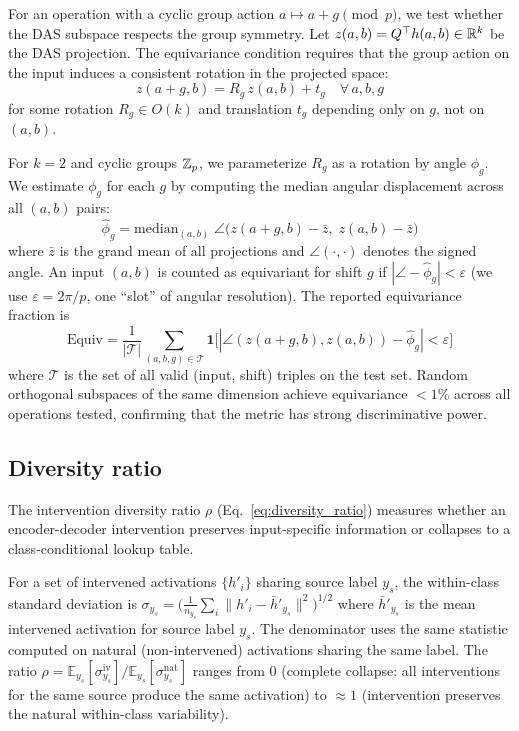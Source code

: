For an operation with a cyclic group action $a \mapsto a + g \pmod{p}$,
we test whether the DAS subspace respects the group symmetry. Let
$z(a,b) = Q^\top h(a,b) \in \mathbb{R}^k$ be the DAS projection. The equivariance
condition requires that the group action on the input induces a
consistent rotation in the projected space:
\begin{equation}
z(a + g, b) = R_g \, z(a, b) + t_g \quad \forall\, a, b, g
\label{eq:equiv_condition}
\end{equation}
for some rotation $R_g \in O(k)$ and translation $t_g$ depending only on
$g$, not on $(a,b)$.

For $k = 2$ and cyclic groups $\mathbb{Z}_p$, we parameterize $R_g$ as a rotation by
angle $\phi_g$. We estimate $\phi_g$ for each $g$ by computing the
median angular displacement across all $(a,b)$ pairs:
\begin{equation}
\hat\phi_g = \mathrm{median}_{(a,b)} \;\angle\bigl(z(a{+}g, b) - \bar{z},\;
z(a, b) - \bar{z}\bigr)
\label{eq:angle_estimate}
\end{equation}
where $\bar{z}$ is the grand mean of all projections and $\angle(\cdot, \cdot)$
denotes the signed angle. An input $(a,b)$ is counted as equivariant for shift
$g$ if $|\angle - \hat\phi_g| < \varepsilon$ (we use $\varepsilon = 2\pi/p$,
one ``slot'' of angular resolution). The reported equivariance fraction is
\begin{equation}
\text{Equiv} = \frac{1}{|\mathcal{T}|} \sum_{(a,b,g) \in \mathcal{T}}
\mathbf{1}\bigl[|\angle(z(a{+}g,b), z(a,b)) - \hat\phi_g| < \varepsilon\bigr]
\label{eq:equiv_fraction}
\end{equation}
where $\mathcal{T}$ is the set of all valid (input, shift) triples on the
test set. Random orthogonal subspaces of the same dimension achieve
equivariance $< 1\%$ across all operations tested, confirming that the
metric has strong discriminative power.

\subsection{Diversity ratio}
\label{app:diversity_ratio}

The intervention diversity ratio $\rho$ (Eq.~\ref{eq:diversity_ratio})
measures whether an encoder-decoder intervention preserves input-specific
information or collapses to a class-conditional lookup table.

For a set of intervened activations $\{h'_i\}$ sharing source label $y_s$,
the within-class standard deviation is
$\sigma_{y_s} = \bigl(\frac{1}{n_{y_s}} \sum_i \|h'_i - \bar{h}'_{y_s}\|^2
\bigr)^{1/2}$
where $\bar{h}'_{y_s}$ is the mean intervened activation for source label $y_s$.
The denominator uses the same statistic computed on natural (non-intervened)
activations sharing the same label. The ratio $\rho = \mathbb{E}_{y_s}[\sigma_{y_s}^{\text{iv}}]
/ \mathbb{E}_{y_s}[\sigma_{y_s}^{\text{nat}}]$ ranges from 0 (complete collapse: all
interventions for the same source produce the same activation) to
$\approx 1$ (intervention preserves the natural within-class variability).

